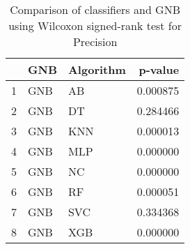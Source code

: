\begin{table}
\footnotesize
\caption{Comparison of classifiers and GNB using Wilcoxon signed-rank test for Precision}
\label{tab:GNB wilcoxon Precision comparison}
\begin{tabular}{lllr}
\hline
 & GNB & Algorithm & p-value \\
\hline
1 & GNB & AB & 0.000875 \\
2 & GNB & DT & 0.284466 \\
3 & GNB & KNN & 0.000013 \\
4 & GNB & MLP & 0.000000 \\
5 & GNB & NC & 0.000000 \\
6 & GNB & RF & 0.000051 \\
7 & GNB & SVC & 0.334368 \\
8 & GNB & XGB & 0.000000 \\
\hline
\end{tabular}
\end{table}
